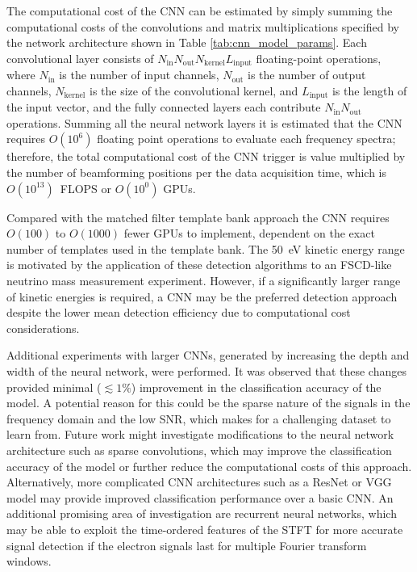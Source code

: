 The computational cost of the CNN can be estimated by simply summing the computational costs of the convolutions and matrix multiplications specified by the network architecture shown in Table \ref{tab:cnn_model_params}. Each convolutional layer consists of $N_\mathrm{in}N_\mathrm{out}N_\mathrm{kernel}L_\mathrm{input}$ floating-point operations, where $N_\mathrm{in}$ is the number of input channels, $N_\mathrm{out}$ is the number of output channels, $N_\mathrm{kernel}$ is the size of the convolutional kernel, and $L_\mathrm{input}$ is the length of the input vector, and the fully connected layers each contribute $N_\mathrm{in}N_\mathrm{out}$ operations. Summing all the neural network layers it is estimated that the CNN requires $O(10^6)$ floating point operations to evaluate each frequency spectra; therefore, the total computational cost of the CNN trigger is value multiplied by the number of beamforming positions per the data acquisition time, which is $O(10^{13})$~FLOPS or $O(10^0)$ GPUs.

Compared with the matched filter template bank approach the CNN requires $O(100)$ to $O(1000)$ fewer GPUs to implement, dependent on the exact number of templates used in the template bank. The 50~eV kinetic energy range is motivated by the application of these detection algorithms to an FSCD-like neutrino mass measurement experiment. However, if a significantly larger range of kinetic energies is required, a CNN may be the preferred detection approach despite the lower mean detection efficiency due to computational cost considerations.


Additional experiments with larger CNNs, generated by increasing the depth and width of the neural network, were performed. It was observed that these changes provided minimal ($\lesssim 1\%$) improvement in the classification accuracy of the model. A potential reason for this could be the sparse nature of the signals in the frequency domain and the low SNR, which makes for a challenging dataset to learn from. Future work might investigate modifications to the neural network architecture such as sparse convolutions, which may improve the classification accuracy of the model or further reduce the computational costs of this approach. Alternatively, more complicated CNN architectures such as a ResNet \cite{resnet, vgg} or VGG model may provide improved classification performance over a basic CNN. An additional promising area of investigation are recurrent neural networks, which may be able to exploit the time-ordered features of the STFT for more accurate signal detection if the electron signals last for multiple Fourier transform windows.

